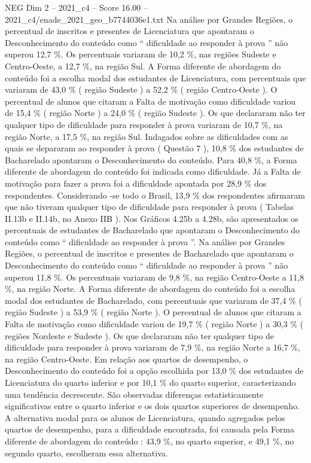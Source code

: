 \begin{textsample}{NEG Dim 2 – 2021\_c4 – Score 16.00 – 2021\_c4/enade\_2021\_geo\_b7744036e1.txt}
Na análise por Grandes Regiões, o percentual de inscritos e presentes de Licenciatura que apontaram o Desconhecimento do conteúdo como “ dificuldade ao responder à prova ” não superou 12,7 \%.
Os percentuais variaram de 10,2 \%, nas regiões Sudeste e Centro-Oeste, a 12,7 \%, na região Sul.
A Forma diferente de abordagem do conteúdo foi a escolha modal dos estudantes de Licenciatura, com percentuais que variaram de 43,0 \% ( região Sudeste ) a 52,2 \% ( região Centro-Oeste ).
O percentual de alunos que citaram a Falta de motivação como dificuldade variou de 15,4 \% ( região Norte ) a 24,0 \% ( região Sudeste ).
Os que declararam não ter qualquer tipo de dificuldade para responder à prova variaram de 10,7 \%, na região Norte, a 17,5 \%, na região Sul.
Indagados sobre as dificuldades com as quais se depararam ao responder à prova ( Questão 7 ), 10,8 \% dos estudantes de Bacharelado apontaram o Desconhecimento do conteúdo.
Para 40,8 \%, a Forma diferente de abordagem do conteúdo foi indicada como dificuldade.
Já a Falta de motivação para fazer a prova foi a dificuldade apontada por 28,9 \% dos respondentes.
Considerando -se todo o Brasil, 13,9 \% dos respondentes afirmaram que não tiveram qualquer tipo de dificuldade para responder à prova ( Tabelas II.13b e II.14b, no Anexo IIB ).
Nos Gráficos 4.25b a 4.28b, são apresentados os percentuais de estudantes de Bacharelado que apontaram o Desconhecimento do conteúdo como “ dificuldade ao responder à prova ”.
Na análise por Grandes Regiões, o percentual de inscritos e presentes de Bacharelado que apontaram o Desconhecimento do conteúdo como “ dificuldade ao responder à prova ” não superou 11,8 \%.
Os percentuais variaram de 9,8 \%, na região Centro-Oeste a 11,8 \%, na região Norte.
A Forma diferente de abordagem do conteúdo foi a escolha modal dos estudantes de Bacharelado, com percentuais que variaram de 37,4 \% ( região Sudeste ) a 53,9 \% ( região Norte ).
O percentual de alunos que citaram a Falta de motivação como dificuldade variou de 19,7 \% ( região Norte ) a 30,3 \% ( regiões Nordeste e Sudeste ).
Os que declararam não ter qualquer tipo de dificuldade para responder à prova variaram de 7,9 \%, na região Norte a 16,7 \%, na região Centro-Oeste.
Em relação aos quartos de desempenho, o Desconhecimento do conteúdo foi a opção escolhida por 13,0 \% dos estudantes de Licenciatura do quarto inferior e por 10,1 \% do quarto superior, caracterizando uma tendência decrescente.
São observadas diferenças estatisticamente significativas entre o quarto inferior e os dois quartos superiores de desempenho.
A alternativa modal para os alunos de Licenciatura, quando agregados pelos quartos de desempenho, para a dificuldade encontrada, foi causada pela Forma diferente de abordagem do conteúdo : 43,9 \%, no quarto superior, e 49,1 \%, no segundo quarto, escolheram essa alternativa.

\end{textsample}
